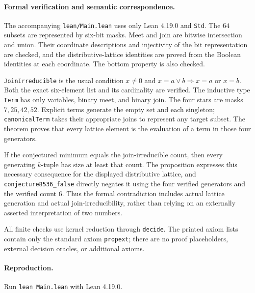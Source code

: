 \documentclass[10pt]{article}
\begin{document}
\paragraph{Formal verification and semantic correspondence.}
The accompanying \texttt{lean/Main.lean} uses only Lean 4.19.0 and \texttt{Std}. The $64$ subsets are represented by six-bit masks. Meet and join are bitwise intersection and union. Their coordinate descriptions and injectivity of the bit representation are checked, and the distributive-lattice identities are proved from the Boolean identities at each coordinate. The bottom property is also checked.

\texttt{JoinIrreducible} is the usual condition $x\ne0$ and $x=a\vee b\Longrightarrow x=a$ or $x=b$. Both the exact six-element list and its cardinality are verified. The inductive type \texttt{Term} has only variables, binary meet, and binary join. The four stars are masks $7,25,42,52$. Explicit terms generate the empty set and each singleton; \texttt{canonicalTerm} takes their appropriate joins to represent any target subset. The theorem  proves that every lattice element is the evaluation of a term in those four generators.

If the conjectured minimum equals the join-irreducible count, then every generating $k$-tuple has size at least that count. The proposition  expresses this necessary consequence for the displayed distributive lattice, and \texttt{conjecture8536\_false} directly negates it using the four verified generators and the verified count $6$. Thus the formal contradiction includes actual lattice generation and actual join-irreducibility, rather than relying on an externally asserted interpretation of two numbers.

All finite checks use kernel reduction through \texttt{decide}. The printed axiom lists contain only the standard axiom \texttt{propext}; there are no proof placeholders, external decision oracles, or additional axioms.
\paragraph{Reproduction.}
Run \texttt{lean Main.lean} with Lean 4.19.0.
\end{document}

